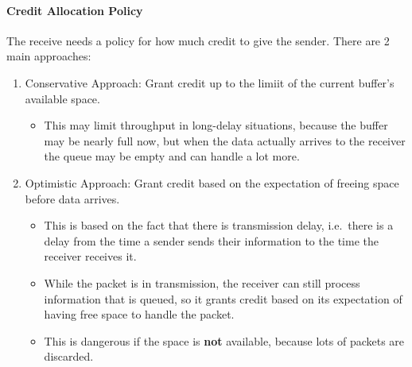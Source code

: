 \paragraph{Credit Allocation Policy}\label{par:TCP_Credit_Allocation_Policy}
The receive needs a policy for how much credit to give the sender.
There are 2 main approaches:
\begin{enumerate}[noitemsep]
\item Conservative Approach: Grant credit up to the limiit of the current buffer's available space.
  \begin{itemize}[noitemsep]
  \item This may limit throughput in long-delay situations, because the buffer may be nearly full now, but when the data actually arrives to the receiver the queue may be empty and can handle a lot more.
  \end{itemize}
\item Optimistic Approach: Grant credit based on the expectation of freeing space before data arrives.
  \begin{itemize}[noitemsep]
  \item This is based on the fact that there is transmission delay, i.e.\ there is a delay from the time a sender sends their information to the time the receiver receives it.
  \item While the packet is in transmission, the receiver can still process information that is queued, so it grants credit based on its expectation of having free space to handle the packet.
  \item This is dangerous if the space is \textbf{not} available, because lots of packets are discarded.
  \end{itemize}
\end{enumerate}

